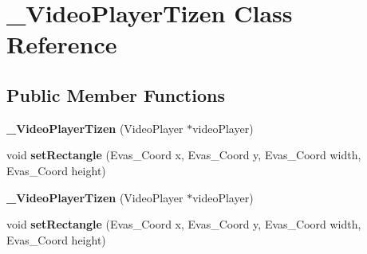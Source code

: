 \hypertarget{class__VideoPlayerTizen}{}\section{\+\_\+\+Video\+Player\+Tizen Class Reference}
\label{class__VideoPlayerTizen}
\subsection*{Public Member Functions}
\begin{DoxyCompactItemize}
\item 
\mbox{\label{class__VideoPlayerTizen_a93e11dacfc973c20fadc9e11cef8a394}} 
{\bfseries \+\_\+\+Video\+Player\+Tizen} (Video\+Player $\ast$video\+Player)
\item 
\mbox{\label{class__VideoPlayerTizen_a3fa078a61ba7a43fbe1891dd33f53bbe}} 
void {\bfseries set\+Rectangle} (Evas\+\_\+\+Coord x, Evas\+\_\+\+Coord y, Evas\+\_\+\+Coord width, Evas\+\_\+\+Coord height)
\item 
\mbox{\label{class__VideoPlayerTizen_a93e11dacfc973c20fadc9e11cef8a394}} 
{\bfseries \+\_\+\+Video\+Player\+Tizen} (Video\+Player $\ast$video\+Player)
\item 
\mbox{\label{class__VideoPlayerTizen_a3fa078a61ba7a43fbe1891dd33f53bbe}} 
void {\bfseries set\+Rectangle} (Evas\+\_\+\+Coord x, Evas\+\_\+\+Coord y, Evas\+\_\+\+Coord width, Evas\+\_\+\+Coord height)
\end{DoxyCompactItemize}
